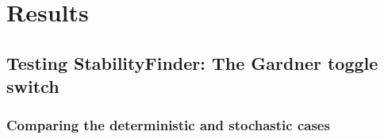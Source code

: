 \section{Results}
\subsection{Testing StabilityFinder: The Gardner toggle switch}

\subsubsection{Comparing the deterministic and stochastic cases} 

